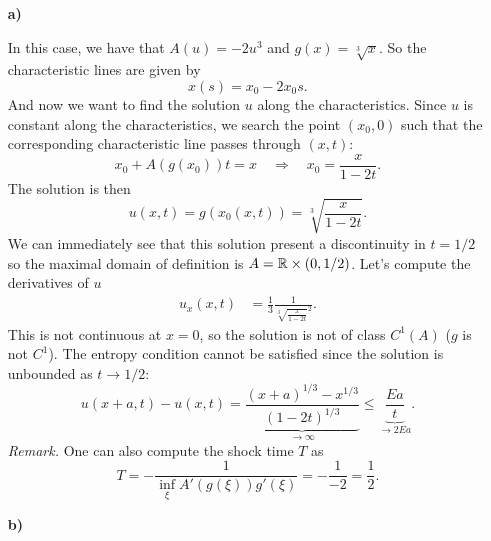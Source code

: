 \begin{enumerate}
    \item[\textbf{a)}]

          In this case, we have that \(A(u) = -2u^3\) and \(g(x) = \sqrt[3]{x}\). So the
          characteristic lines are given by
          \[
              x(s) = x_0 - 2 x_0 s.
          \]
          And now we want to find the solution \(u\) along the characteristics. Since
          \(u\) is constant along the characteristics, we search the point \((x_0, 0)\)
          such that the corresponding characteristic line passes through \((x, t)\):
          \[
              x_0 + A(g(x_0)) t = x \quad \Rightarrow \quad x_0 = \frac{x}{1-2t}.
          \]
          The solution is then
          \[
              u(x,t) = g(x_0(x,t)) = \sqrt[3]{\frac{x}{1-2t}}.
          \]
          We can immediately see that this solution present a discontinuity in \(t=1/2\)
          so the maximal domain of definition is \(A = \mathbb{R} \times (0, 1/2)\). Let's
          compute the derivatives of \(u\)
          \begin{align*}
              u_x(x,t) & = \frac{1}{3} \frac{1}{\sqrt[3]{\frac{x}{1-2t}}^2}.
          \end{align*}
          This is not continuous at \(x=0\), so the solution is not of class \(C^1(A)\) ($g$ is not $C^1$).
          The entropy condition cannot be satisfied since the solution is unbounded as \(t \to 1/2\):
          \[
              u(x+a,t) - u(x,t) = \underbrace{\frac{(x+a)^{1/3}-x^{1/3}}{(1-2t)^{1/3}}}_{\rightarrow \infty}
              \leq \underbrace{\frac{Ea}{t}}_{\rightarrow 2Ea}.
          \]
          \textit{Remark.} One can also compute the shock time \(T\) as
          \[
              T = - \frac{1}{\inf_\xi A'(g(\xi))g'(\xi)} = -\frac{1}{-2} = \frac{1}{2}.
          \]
    \item[\textbf{b)}]


\end{enumerate}
